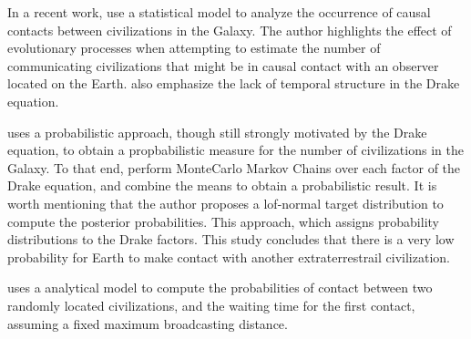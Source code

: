 \documentclass[crop]{CSLB}%
\begin{document}
In a recent work, \citep{balbi_impact_2018} use a statistical model to analyze
the occurrence of causal contacts between civilizations in the Galaxy.
%
The author highlights the effect of evolutionary processes when
attempting to estimate the number of communicating civilizations that
might be in causal contact with an observer located on the Earth.
%
\citet{cirkovic_temporal_2004} also emphasize the lack of temporal
structure in the Drake equation.





\citet{bloetscher_using_2019} uses a probabilistic approach, though
still strongly motivated by the Drake equation, to obtain a
propbabilistic measure for the number of civilizations in the Galaxy.
To that end, perform MonteCarlo Markov Chains over each factor of the
Drake equation, and combine the means to obtain a probabilistic
result. It is worth mentioning that the author proposes a lof-normal
target distribution to compute the posterior probabilities. This
approach, which assigns probability distributions to the Drake
factors. This study concludes that there is a very low probability for
Earth to make contact with another extraterrestrail civilization.    

\citet{smith_broadcasting_2009} uses a analytical model to compute the
probabilities of contact between two randomly located civilizations,
and the waiting time for the first contact, assuming a fixed maximum
broadcasting distance.
 
\end{document}
